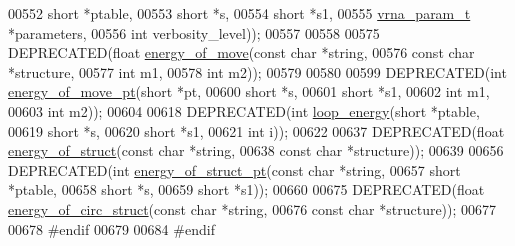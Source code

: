 \begin{DoxyCode}
00552                                        \textcolor{keywordtype}{short}        *ptable,
00553                                        \textcolor{keywordtype}{short}        *s,
00554                                        \textcolor{keywordtype}{short}        *s1,
00555                                        \hyperlink{group__energy__parameters_structvrna__param__s}{vrna\_param\_t} *parameters,
00556                                        \textcolor{keywordtype}{int}          verbosity\_level));
00557 
00558 
00575 DEPRECATED(\textcolor{keywordtype}{float} \hyperlink{group__eval_ga539ecaed89730f7644c202f304d7529b}{energy\_of\_move}(\textcolor{keyword}{const} \textcolor{keywordtype}{char}  *\textcolor{keywordtype}{string},
00576                                 \textcolor{keyword}{const} \textcolor{keywordtype}{char}  *structure,
00577                                 \textcolor{keywordtype}{int}         m1,
00578                                 \textcolor{keywordtype}{int}         m2));
00579 
00580 
00599 DEPRECATED(\textcolor{keywordtype}{int} \hyperlink{group__eval_ga49e0ee561be69faf0568213546f6a53f}{energy\_of\_move\_pt}(\textcolor{keywordtype}{short}  *pt,
00600                                  \textcolor{keywordtype}{short}  *s,
00601                                  \textcolor{keywordtype}{short}  *s1,
00602                                  \textcolor{keywordtype}{int}    m1,
00603                                  \textcolor{keywordtype}{int}    m2));
00604 
00618 DEPRECATED(\textcolor{keywordtype}{int}   \hyperlink{group__eval_ga507d4fd93f4b398d793ba2402731388d}{loop\_energy}(\textcolor{keywordtype}{short}  *ptable,
00619                              \textcolor{keywordtype}{short}  *s,
00620                              \textcolor{keywordtype}{short}  *s1,
00621                              \textcolor{keywordtype}{int}    i));
00622 
00637 DEPRECATED(\textcolor{keywordtype}{float} \hyperlink{group__eval_gac2b37fea2145c94d925a3f33378ef87b}{energy\_of\_struct}(\textcolor{keyword}{const} \textcolor{keywordtype}{char}  *\textcolor{keywordtype}{string},
00638                                   \textcolor{keyword}{const} \textcolor{keywordtype}{char}  *structure));
00639 
00656 DEPRECATED(\textcolor{keywordtype}{int} \hyperlink{group__eval_ga27ce6f68512d43bf1fe14a06c9d76d5c}{energy\_of\_struct\_pt}(\textcolor{keyword}{const} \textcolor{keywordtype}{char} *\textcolor{keywordtype}{string},
00657                                    \textcolor{keywordtype}{short}      *ptable,
00658                                    \textcolor{keywordtype}{short}      *s,
00659                                    \textcolor{keywordtype}{short}      *s1));
00660 
00675 DEPRECATED(\textcolor{keywordtype}{float} \hyperlink{group__eval_ga657222e2758c46bf13b416ef3032e417}{energy\_of\_circ\_struct}(\textcolor{keyword}{const} \textcolor{keywordtype}{char} *\textcolor{keywordtype}{string},
00676                                        \textcolor{keyword}{const} \textcolor{keywordtype}{char} *structure));
00677 
00678 \textcolor{preprocessor}{#endif}
00679 
00684 \textcolor{preprocessor}{#endif}
\end{DoxyCode}
